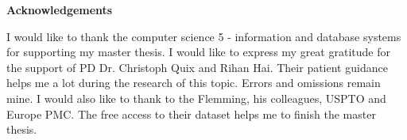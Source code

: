 \thispagestyle{empty}

\centerline{\Large{\textbf{Acknowledgements}}}

\vspace{2cm}

\noindent 
I would like to thank the computer science 5 - information and database systems for supporting my master thesis. I would like to express my great gratitude for the support of PD Dr. Christoph Quix and Rihan Hai. Their patient guidance helps me a lot during the research of this topic. Errors and omissions remain mine. I would also like to thank to the Flemming, his colleagues, USPTO and Europe PMC. The free access to their dataset helps me to finish the master thesis. 

\newpage
\thispagestyle{empty}

\rule{0cm}{5cm}